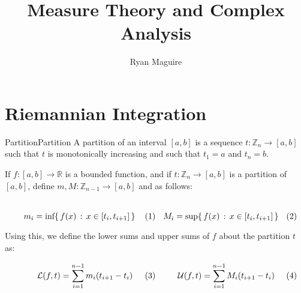 \documentclass[crop=false,class=article]{standalone}                           %
\begin{document}
    \title{Measure Theory and Complex Analysis}
    \author{Ryan Maguire}
    \date{\vspace{-5ex}}
    \maketitle
    \tableofcontents
    \clearpage
    \vspace{10ex}
    \section{Riemannian Integration}
        \begin{fdefinition}{Partition}{Partition}
            A partition of an interval $[a,b]$ is a sequence
            $t:\mathbb{Z}_{n}\rightarrow[a,b]$ such that $t$ is
            monotonically increasing and such that $t_{1}=a$ and $t_{n}=b$.
        \end{fdefinition}
        If $f:[a,b]\rightarrow\mathbb{R}$ is a bounded function, and if
        $t:\mathbb{Z}_{n}\rightarrow[a,b]$ is a partition of $[a,b]$, define
        $m,M:\mathbb{Z}_{n-1}\rightarrow[a,b]$ and as follows:
        \par
        \begin{subequations}
            \begin{minipage}[b]{0.49\textwidth}
                \begin{equation}
                    m_{i}=\textrm{inf}\{\,f(x)\,:\,x\in[t_{i},t_{i+1}]\,\}
                \end{equation}
            \end{minipage}
            \hfill
            \begin{minipage}[b]{0.49\textwidth}
                \begin{equation}
                    M_{i}=\textrm{sup}\{\,f(x)\,:\,x\in[t_{i},t_{i+1}]\,\}
                \end{equation}
            \end{minipage}
        \end{subequations}
        \par\vspace{2.5ex}
        Using this, we define the lower sums and upper sums of $f$ about
        the partition $t$ as:
        \par
        \begin{subequations}
            \begin{minipage}[b]{0.49\textwidth}
                \begin{equation}
                    \mathcal{L}(f,t)=\sum_{i=1}^{n-1}m_{i}(t_{i+1}-t_{i})
                \end{equation}
            \end{minipage}
            \hfill
            \begin{minipage}[b]{0.49\textwidth}
                \begin{equation}
                    \mathcal{U}(f,t)=\sum_{i=1}^{n-1}M_{i}(t_{i+1}-t_{i})
                \end{equation}
            \end{minipage}
        \end{subequations}
\end{document}

